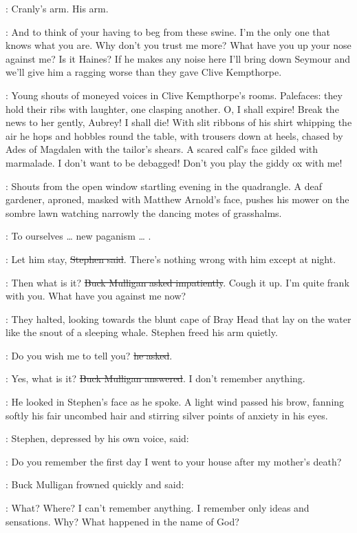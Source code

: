 \StephenInt:
Cranly's arm.
His arm.

\Mulligan:
And to think of your having to beg from these swine.
I'm the only one that knows what you are.
Why don't you trust me more?
What have you up your nose against me?
Is it Haines?
If he makes any noise here
I'll bring down Seymour
and we'll give him a ragging worse than they gave Clive Kempthorpe.

\StephenInt:
Young shouts of moneyed voices in Clive Kempthorpe's rooms.
Palefaces:
they hold their ribs with laughter,
one clasping another.
O, I shall expire!
Break the news to her gently, Aubrey!
I shall die!
With slit ribbons of his shirt whipping the air
he hops and hobbles round the table,
with trousers down at heels,
chased by Ades of Magdalen with the tailor's shears.
A scared calf's face gilded with marmalade.
I don't want to be debagged!
Don't you play the giddy ox with me!

\StephenInt:
Shouts from the open window
startling evening in the quadrangle.
A deaf gardener,
aproned, masked with Matthew Arnold's face,
pushes his mower on the sombre lawn
watching narrowly the dancing motes of grasshalms.

\StephenInt:
To ourselves … new paganism … .

\Stephen:
Let him stay,
\sout{Stephen said}.
There's nothing wrong with him except at night.

\Mulligan:
Then what is it?
\sout{Buck Mulligan asked impatiently}.
Cough it up.
I'm quite frank with you.
What have you against me now?

:
They halted,
looking towards the blunt cape of Bray Head
that lay on the water like the snout of a sleeping whale.
Stephen freed his arm quietly.

\Stephen:
Do you wish me to tell you?
\sout{he asked}.

\Mulligan:
Yes, what is it?
\sout{Buck Mulligan answered}.
I don't remember anything.

:
He looked in Stephen's face as he spoke.
A light wind passed his brow,
fanning softly his fair uncombed hair
and stirring silver points of anxiety in his eyes.

:
Stephen,
depressed by his own voice,
said:

\Stephen:
Do you remember the first day I went to your house
after my mother's death?

:
Buck Mulligan frowned quickly and said:

\Mulligan:
What?
Where?
I can't remember anything.
I remember only ideas and sensations.
Why?
What happened in the name of God?

